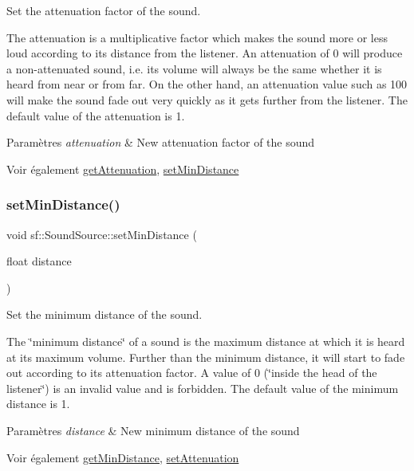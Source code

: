 Set the attenuation factor of the sound. 

The attenuation is a multiplicative factor which makes the sound more or less loud according to its distance from the listener. An attenuation of 0 will produce a non-\/attenuated sound, i.\+e. its volume will always be the same whether it is heard from near or from far. On the other hand, an attenuation value such as 100 will make the sound fade out very quickly as it gets further from the listener. The default value of the attenuation is 1.


\begin{DoxyParams}{Paramètres}
{\em attenuation} & New attenuation factor of the sound\\
\hline
\end{DoxyParams}
\begin{DoxySeeAlso}{Voir également}
\hyperlink{classsf_1_1SoundSource_a8ad7dafb4f1b4afbc638cebe24f48cc9}{get\+Attenuation}, \hyperlink{classsf_1_1SoundSource_a75bbc2c34addc8b25a14edb908508afe}{set\+Min\+Distance} 
\end{DoxySeeAlso}
\mbox{\label{classsf_1_1SoundSource_a75bbc2c34addc8b25a14edb908508afe}} 
\subsubsection{\texorpdfstring{set\+Min\+Distance()}{setMinDistance()}}
{\footnotesize\ttfamily void sf\+::\+Sound\+Source\+::set\+Min\+Distance (\begin{DoxyParamCaption}\item[{float}]{distance }\end{DoxyParamCaption})}



Set the minimum distance of the sound. 

The \char`\"{}minimum distance\char`\"{} of a sound is the maximum distance at which it is heard at its maximum volume. Further than the minimum distance, it will start to fade out according to its attenuation factor. A value of 0 (\char`\"{}inside the head
of the listener\char`\"{}) is an invalid value and is forbidden. The default value of the minimum distance is 1.


\begin{DoxyParams}{Paramètres}
{\em distance} & New minimum distance of the sound\\
\hline
\end{DoxyParams}
\begin{DoxySeeAlso}{Voir également}
\hyperlink{classsf_1_1SoundSource_a605ca7f359ec1c36fcccdcd4696562ac}{get\+Min\+Distance}, \hyperlink{classsf_1_1SoundSource_aa2adff44cd2f8b4e3c7315d7c2a45626}{set\+Attenuation} 
\end{DoxySeeAlso}
\mbox{\label{classsf_1_1SoundSource_a72a13695ed48b7f7b55e7cd4431f4bb6}} 
